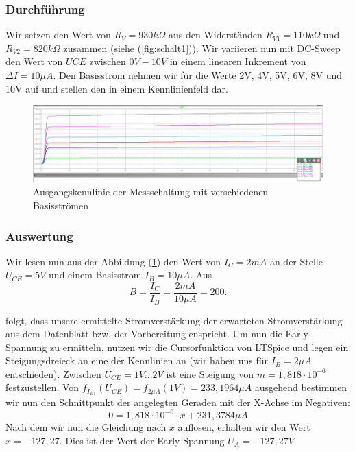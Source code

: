 \documentclass{article}
\begin{document}
\subsubsection{Durchführung}
Wir setzen den Wert von $R_{V} = 930k\Omega$ aus den Widerständen $R_{V1} = 110k\Omega$ und $R_{V2} = 820k\Omega$ zusammen (siehe (\ref{fig:schalt1})). Wir variieren nun mit DC-Sweep den Wert von $UCE$ zwischen $0V-10V$ in einem linearen Inkrement von $\Delta I = 10\mu A$. Den Basisstrom nehmen wir für die Werte 2V, 4V, 5V, 6V, 8V und 10V auf und stellen den in einem Kennlinienfeld dar.

\begin{figure}[h]
  \centering
  \includegraphics[width=\textwidth]{../assets/images/EL1P3/ausgangskennlinie.png}
  \caption{Ausgangskennlinie der Messschaltung mit verschiedenen Basisströmen}
  \label{fig:ausgang}
\end{figure}

\subsubsection{Auswertung}

Wir lesen nun aus der Abbildung (\ref{fig:ausgang}) den Wert von $I_{C} = 2mA$ an der Stelle $U_{CE} = 5V$ und einem Basisstrom $I_{B} = 10\mu A$. Aus
\begin{equation}
  \label{eq:3}
  B = \frac{I_{C}}{I_{B}} = \frac{2mA}{10\mu A} = 200.
\end{equation}

folgt, dass unsere ermittelte Stromverstärkung der erwarteten Stromverstärkung aus dem Datenblatt bzw. der Vorbereitung enspricht. Um nun die Early-Spannung zu ermitteln, nutzen wir die Cursorfunktion von LTSpice und legen ein Steigungsdreieck an eine der Kennlinien an (wir haben uns für $I_{B} = 2\mu A$ entschieden). Zwischen $U_{CE} = 1V...2V$ ist eine Steigung von $m = 1,818\cdot 10^{-6}$ festzustellen. Von $f_{I_{B1}}(U_{CE}) = f_{2\mu A}(1V) = 233,1964\mu A$ ausgehend bestimmen wir nun den Schnittpunkt der angelegten Geraden mit der X-Achse im Negativen:
\begin{equation}
  \label{eq:4}
  0 = 1,818\cdot 10^{-6}\cdot x + 231,3784\mu A
\end{equation}
Nach dem wir nun die Gleichung nach $x$ auflösen, erhalten wir den Wert $x = -127,27$. Dies ist der Wert der Early-Spannung $U_{A} = -127,27V$.
\newpage
\end{document}
